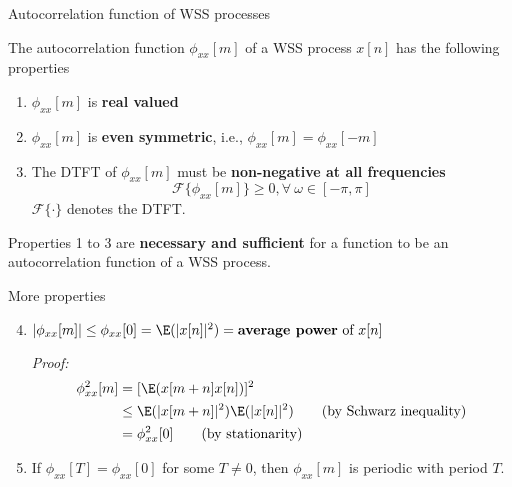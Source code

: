 \documentclass[10pt, aspectratio=169]{beamer}
\begin{document}
%
\begin{frame}{Autocorrelation function of WSS processes}

The autocorrelation function $\phi_{xx}[m]$ of a WSS process $x[n]$ has the following properties

\begin{enumerate}
	\item $\phi_{xx}[m]$ is \textbf{real valued}
	\item $\phi_{xx}[m]$ is \textbf{even symmetric}, i.e., $\phi_{xx}[m] = \phi_{xx}[-m]$
	\item The DTFT of $\phi_{xx}[m]$ must be \textbf{non-negative at all frequencies}
	\begin{equation}
	\mathcal{F}\{\phi_{xx}[m]\} \geq 0, \forall~\omega\in[-\pi, \pi]
	\end{equation}
	$\mathcal{F}\{\cdot\}$ denotes the DTFT.	
\end{enumerate}

	Properties 1 to 3 are \textbf{necessary and sufficient} for a function to be an autocorrelation function of a WSS process.
\end{frame}

%
\begin{frame}
More properties
\begin{enumerate}\setcounter{enumi}{3}
	\item $|\phi_{xx}[m]| \leq \phi_{xx}[0] = \E(|x[n]|^2) = \text{\textbf{average power} of}~x[n]$
	
\textit{Proof:}
\begin{align*}
\phi_{xx}^2[m] &= [\E(x[m+n]x[n])]^2 \\
&\leq \E(|x[m+n]|^2)\E(|x[n]|^2) \tag{by Schwarz inequality} \\
&=\phi_{xx}^2[0] \tag{by stationarity}
\end{align*}
	\item If $\phi_{xx}[T] = \phi_{xx}[0]$ for some $T\neq 0$, then $\phi_{xx}[m]$ is periodic with period $T$.
\end{enumerate}
\end{frame}
\end{document}
